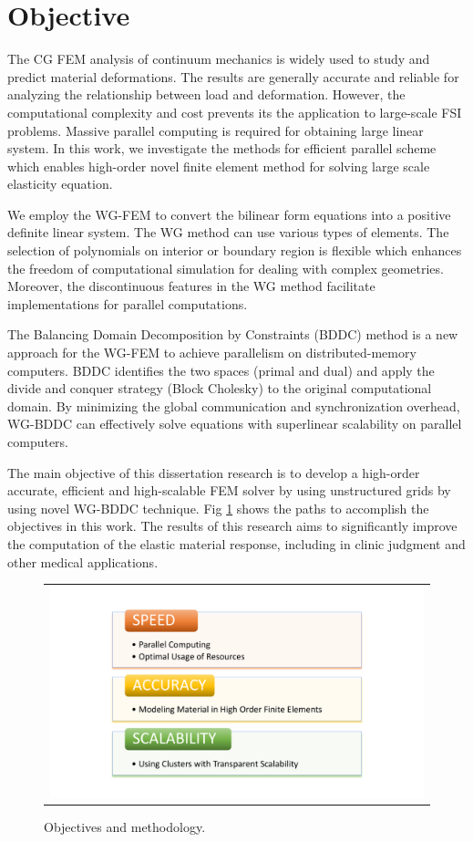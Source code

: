 \section{Objective}

The CG FEM analysis of continuum mechanics is widely used to study and predict material deformations. The results are generally accurate and reliable for analyzing the relationship between load and deformation. However, the computational complexity and cost prevents its the application to large-scale FSI problems. Massive parallel computing is required for obtaining large linear system. In this work, we investigate the methods for efficient parallel scheme which enables high-order novel finite element method for solving large scale elasticity equation.

We employ the WG-FEM to convert the bilinear form equations into a positive definite linear system. The WG method can use various types of elements. The selection of polynomials on interior or boundary region is flexible which enhances the freedom of computational simulation for dealing with complex geometries. Moreover, the discontinuous features in the WG method facilitate implementations for parallel computations.

The Balancing Domain Decomposition by Constraints (BDDC) method is a new approach for the WG-FEM to achieve parallelism on distributed-memory computers. BDDC identifies the two spaces (primal and dual) and apply the divide and conquer strategy (Block Cholesky) to the original computational domain. By minimizing the global communication and synchronization overhead,  WG-BDDC can effectively solve equations with superlinear scalability on parallel computers.

The main objective of this dissertation research is to develop a high-order accurate, efficient and high-scalable FEM solver by using unstructured grids by using novel WG-BDDC technique. Fig \ref{fig: ch1p4} shows the paths to accomplish the objectives in this work. The results of this research aims to significantly improve the computation of the elastic material response, including in clinic judgment and other medical applications.

\begin{figure}[H]
	\centering
	\begin{tabular}{c}
		\includegraphics[width=1.0\textwidth]{./pics/ch1p4}
	\end{tabular}
	\caption{\footnotesize Objectives and methodology.} \label{fig: ch1p4}
\end{figure}

